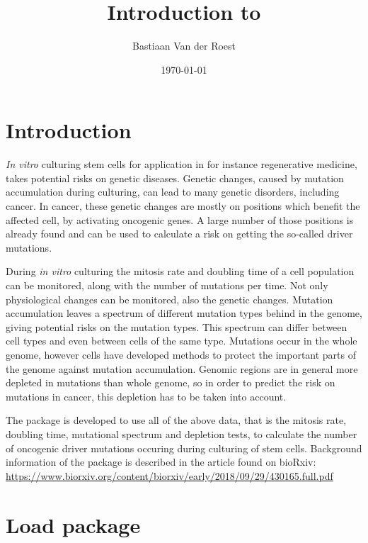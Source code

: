 \documentclass{article}
\title{Introduction to \Biocpkg{DriverProbabilities}}
\author{Bastiaan Van der Roest}
\affil{University Medical Center Utrecht, Utrecht, The Netherlands}
\date{\today}
\begin{document}
 


\maketitle

\tableofcontents

\newpage{}


\section{Introduction}

\textit{In vitro} culturing stem cells for application in for instance 
regenerative medicine, takes potential risks on genetic diseases. Genetic 
changes, caused by mutation accumulation during culturing, can lead to many
genetic disorders, including cancer. In cancer, these genetic changes are
mostly on positions which benefit the affected cell, by activating oncogenic
genes. A large number of those positions is already found and can be used to 
calculate a risk on getting the so-called driver mutations. 

During \textit{in vitro} culturing the mitosis rate and doubling time of a cell
population can be monitored, along with the number of mutations per time. Not
only physiological changes can be monitored, also the genetic changes.
Mutation accumulation leaves a spectrum of different mutation types behind in 
the genome, giving potential risks on the mutation types. This spectrum can 
differ between cell types and even between cells of the same type.
Mutations occur in the whole genome, however cells have developed methods to 
protect the important parts of the genome against mutation accumulation. Genomic
regions are in general more depleted in mutations than whole genome, so in order
to predict the risk on mutations in cancer, this depletion has to be taken into
account. 

The package  is developed to use all of the above
data, that is the mitosis rate, doubling time, mutational spectrum and depletion 
tests, to calculate the number of oncogenic driver mutations occuring during 
culturing of stem cells. Background information of the package is described
in the article found on bioRxiv: 
\url{https://www.biorxiv.org/content/biorxiv/early/2018/09/29/430165.full.pdf}

\newpage{}

\section{Load package}
\end{document}
